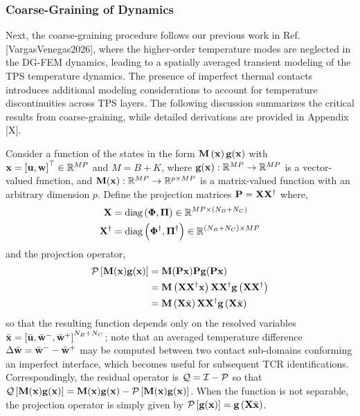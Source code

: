 \subsubsection{Coarse-Graining of Dynamics}

Next, the coarse-graining procedure follows our previous work in Ref. [VargasVenegas2026], where the higher-order temperature modes are neglected in the DG-FEM dynamics, leading to a spatially averaged transient modeling of the TPS temperature dynamics. The presence of imperfect thermal contacts introduces additional modeling considerations to account for temperature discontinuities across TPS layers. The following discussion summarizes the critical results from coarse-graining, while detailed derivations are provided in Appendix [X].

Consider a function of the states in the form $\mathbf{M}\left(\mathbf{x}\right)\mathbf{g}(\mathbf{x})$ with $\mathbf{x}=\left[\mathbf{u},\mathbf{w}\right]^\top\in\mathbb{R}^{MP}$ and $M=B+K$, where $\mathbf{g}(\mathbf{x}):\mathbb{R}^{MP}\rightarrow\mathbb{R}^{MP}$ is a vector-valued function, and $\mathbf{M}(\mathbf{x}):\mathbb{R}^{MP}\rightarrow\mathbb{R}^{p\times MP}$ is a matrix-valued function with an arbitrary dimension $p$. Define the projection matrices $\mathbf{P} = \mathbf{X}\mathbf{X}^{\dagger}$ where,
\begin{subequations}
    \begin{align}
        \mathbf{X} &= \text{diag}\left(\boldsymbol{\Phi},\boldsymbol{\Pi}\right)\in\mathbb{R}^{MP\times (N_{B} + N_C)}\\
        \mathbf{X}^{\dagger} &= \text{diag}\left(\boldsymbol{\Phi}^{\dagger},\boldsymbol{\Pi}^{\dagger}\right) \in\mathbb{R}^{(N_B + N_C)\times MP}
    \end{align}
\end{subequations}
and the projection operator,
\begin{subequations}
    \begin{align}
        \mathcal{P}\left[\mathbf{M}(\mathbf{x})\mathbf{g}(\mathbf{x})\right] &= \mathbf{M}(\mathbf{P}\mathbf{x})\mathbf{P}\mathbf{g}(\mathbf{P}\mathbf{x})\\
        &= \mathbf{M}\left(\mathbf{X}\mathbf{X}^{\dagger}\mathbf{x}\right)\mathbf{X}\mathbf{X}^{\dagger}\mathbf{g}\left(\mathbf{X}\mathbf{X}^{\dagger}\right)\\
        &= \mathbf{M}\left(\mathbf{X}\bar{\mathbf{x}}\right)\mathbf{X}\mathbf{X}^{\dagger}\mathbf{g}\left(\mathbf{X}\bar{\mathbf{x}}\right)
    \end{align}
\end{subequations}
so that the resulting function depends only on the resolved variables $\bar{\mathbf{x}}=\left[\bar{\mathbf{u}},\bar{\mathbf{w}}^{-},\bar{\mathbf{w}}^{+}\right]^{N_{B}+N_C}$; note that an averaged temperature difference $\Delta\bar{\mathbf{w}} = \bar{\mathbf{w}}^- - \bar{\mathbf{w}}^+$ may be computed between two contact sub-domains conforming an imperfect interface, which becomes useful for subsequent TCR identifications. Correspondingly, the residual operator is $\mathcal{Q} = \mathcal{I} - \mathcal{P}$ so that $\mathcal{Q}\left[\mathbf{M}(\mathbf{x})\mathbf{g}(\mathbf{x})\right] = \mathbf{M}(\mathbf{x})\mathbf{g}(\mathbf{x}) - \mathcal{P}\left[\mathbf{M}(\mathbf{x})\mathbf{g}(\mathbf{x})\right]$. When the function is not separable, the projection operator is simply given by $\mathcal{P}\left[\mathbf{g}(\mathbf{x})\right]=\mathbf{g}\left(\mathbf{X}\bar{\mathbf{x}}\right)$.

